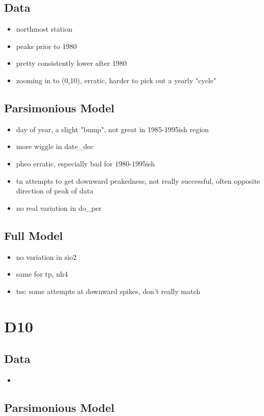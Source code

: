 \documentclass[12pt]{amsart}
\begin{document}
\subsection{Data}
\begin{itemize}
\item northmost station
\item peaks prior to 1980
\item pretty consistently lower after 1980
\item zooming in to (0,10), erratic, harder to pick out a yearly "cycle"
\end{itemize}
\subsection{Parsimonious Model}
\begin{itemize}
\item day of year, a slight "bump", not great in 1985-1995ish region
\item more wiggle in date_dec
\item pheo erratic, especially bad for 1980-1995ish
\item tn attempts to get downward peakedness, not really successful, often opposite direction of peak of data
\item no real variation in do_per
\end{itemize}
\subsection{Full Model}

\begin{itemize}
\item no variation in sio2
\item same for tp, nh4
\item tss: some attempts at downward spikes, don't really match
\end{itemize}

\section{D10}
\subsection{Data}
\begin{itemize}
\item
\end{itemize}
\subsection{Parsimonious Model}
\end{document}
